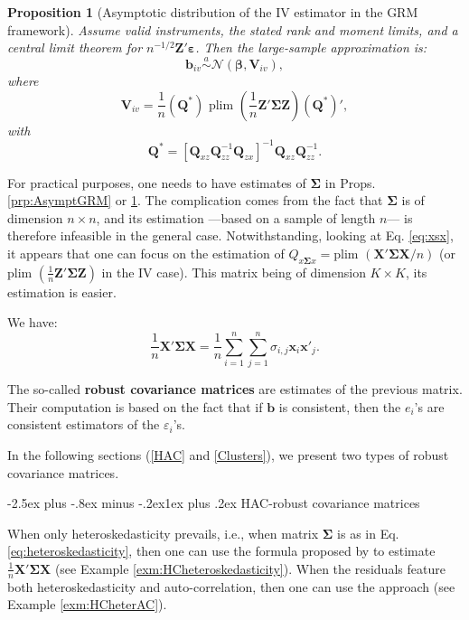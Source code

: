 \documentclass[
  11pt,
]{book}
\makeatletter
\renewcommand\subsection{\@startsection{subsection}{2}{\z@}
  {-2.5ex plus -.8ex minus -.2ex}{1ex plus .2ex}
  {\normalfont\large\bfseries\color{TextbookInk}}}
\newtheorem{proposition}{Proposition}[chapter]
\theoremstyle{definition}
\theoremstyle{definition}
\theoremstyle{definition}
\theoremstyle{definition}
\theoremstyle{remark}
\makeatother
\begin{document}
\begin{proposition}[Asymptotic distribution of the IV estimator in the GRM framework]
\protect\hypertarget{prp:AsymptIVGRM}{}\label{prp:AsymptIVGRM}Assume valid instruments, the stated rank and moment limits, and a central limit theorem for \(n^{-1/2}\mathbf{Z}'\boldsymbol\varepsilon\). Then the large-sample approximation is:
\[
\mathbf{b}_{iv} \overset{a}{\sim} \mathcal{N}(\boldsymbol\beta,\mathbf{V}_{iv}),
\]
where
\[
\mathbf{V}_{iv} = \frac{1}{n}(\mathbf{Q}^*)\mbox{ plim }\left(\frac{1}{n} \mathbf{Z}'\boldsymbol\Sigma \mathbf{Z}\right)(\mathbf{Q}^*)',
\]
with
\[
\mathbf{Q}^* = [\mathbf{Q}_{xz}\mathbf{Q}_{zz}^{-1}\mathbf{Q}_{zx}]^{-1}\mathbf{Q}_{xz}\mathbf{Q}_{zz}^{-1}.
\]
\end{proposition}

For practical purposes, one needs to have estimates of \(\boldsymbol\Sigma\) in Props. \ref{prp:AsymptGRM} or \ref{prp:AsymptIVGRM}. The complication comes from the fact that \(\boldsymbol\Sigma\) is of dimension \(n \times n\), and its estimation ---based on a sample of length \(n\)--- is therefore infeasible in the general case. Notwithstanding, looking at Eq. \eqref{eq:xsx}, it appears that one can focus on the estimation of \(Q_{x\boldsymbol\Sigma x}=\mbox{plim }(\mathbf{X}'\boldsymbol\Sigma\mathbf{X}/n)\) (or \(\mbox{plim }\left(\frac{1}{n} \mathbf{Z}'\boldsymbol\Sigma \mathbf{Z}\right)\) in the IV case). This matrix being of dimension \(K \times K\), its estimation is easier.

We have:
\begin{equation}
\frac{1}{n}\mathbf{X}'\boldsymbol\Sigma\mathbf{X} = \frac{1}{n}\sum_{i=1}^{n}\sum_{j=1}^{n}\sigma_{i,j}\mathbf{x}_i\mathbf{x}'_j. \label{eq:GeneralXSigmaX}
\end{equation}

The so-called \textbf{robust covariance matrices} are estimates of the previous matrix. Their computation is based on the fact that if \(\mathbf{b}\) is consistent, then the \(e_i\)'s are consistent estimators of the \(\varepsilon_i\)'s.

In the following sections (\ref{HAC} and \ref{Clusters}), we present two types of robust covariance matrices.

\subsection{HAC-robust covariance matrices}\label{HAC}

When only heteroskedasticity prevails, i.e., when matrix \(\boldsymbol\Sigma\) is as in Eq. \eqref{eq:heteroskedasticity}, then one can use the formula proposed by \citet{White_1980} to estimate \(\frac{1}{n}\mathbf{X}'\boldsymbol\Sigma\mathbf{X}\) (see Example \ref{exm:HCheteroskedasticity}). When the residuals feature both heteroskedasticity and auto-correlation, then one can use the \citet{Newey_West_1987} approach (see Example \ref{exm:HCheterAC}).
\end{document}
